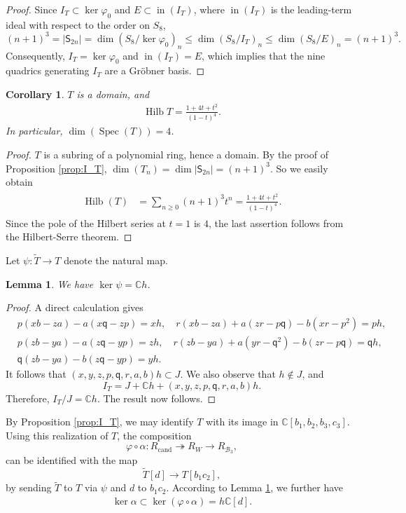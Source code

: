 \documentclass[11pt]{amsart}
\newtheorem{lemma}[theorem]{Lemma}
\newtheorem{corollary}[theorem]{Corollary}
\theoremstyle{definition}
\theoremstyle{remark}
\newcommand{\B}{\mathcal B}
\begin{document}
\begin{proof}
Since $I_T\subset \ker \varphi_0$ and $E\subset \operatorname{in}(I_T)$, where $ \operatorname{in}(I_T)$ is the leading-term ideal with respect to the order on $S_8$, 
\[(n+1)^3=|\mathsf{S}_{2n}|=\dim(S_8/\ker \varphi_0)_{n}\leq \dim(S_8/I_T)_n\leq \dim(S_8/E)_n=(n+1)^3.\] Consequently, $I_T=\ker \varphi_0$ and $\operatorname{in}(I_T)=E$, which implies that the nine quadrics generating $I_T$ are a Gr\"{o}bner basis.  \end{proof}
\begin{corollary}\label{cor:HilbT}
$T$ is a domain, and 
\begin{align*}
\operatorname{Hilb}T=\frac{1+4t+t^2}{(1-t)^4}.	
\end{align*}
In particular, $\dim (\operatorname{Spec}(T))=4$. 
\end{corollary}
\begin{proof}
$T$ is a subring of a polynomial ring, hence a domain. By the proof of Proposition \ref{prop:I_T}, $\dim(T_n)=\dim |\mathsf S_{2n}|=(n+1)^3$. So we easily obtain
\begin{align}\label{formu:HilbT}
\begin{split}
\operatorname{Hilb}(T)&=\sum_{n\geq 0} (n+1)^3 t^n=\frac{1+4t+t^2}{(1-t)^4}.
\end{split}
\end{align}
Since the pole of the Hilbert series at $t=1$ is $4$, the last assertion follows from the Hilbert-Serre theorem.
\end{proof}



Let $\psi: \tilde{T}\rightarrow T$ denote the natural map. 
\begin{lemma}\label{lem:kerpsi}
We have $\ker \psi=\mathbb{C}h$.
\end{lemma}
\begin{proof}
A direct calculation gives
\begin{align*}
	&p(xb-za)-a(x\mathsf q-z p)=xh,\quad r(xb-za)+a(zr-p\mathsf q)-b(xr-p^2)=ph,\\
	&p(zb-ya)-a(z\mathsf q-yp)=zh,\quad r(zb-ya)+a(yr-\mathsf{q}^2)-b(zr-p\mathsf{q})=\mathsf{q}h,\\
	&\mathsf{q}(zb-ya)-b(z\mathsf{q}-yp)=yh.
\end{align*}
It follows that $(x,y,z,p,\mathsf{q},r,a,b)h\subset J$. We also observe that $h\notin J$, and \[I_T=J+\mathbb{C}h+(x,y,z,p,\mathsf{q},r,a,b)h.\] Therefore, $I_T/J=\mathbb{C}h$. The result now follows. 
\end{proof}
By Proposition \ref{prop:I_T},  we may identify $T$ with its image in $\mathbb{C}[b_1,b_2,b_3,c_3]$. Using this realization of $T$, the composition 
\[\varphi\circ \alpha: R_{\mathrm{cand}}\twoheadrightarrow R_W \rightarrow R_{\B_3},\] can be identified with the map \[\tilde{T}[d]\longrightarrow T[b_1c_2],\] by sending $\tilde{T}$ to $T$ via $\psi$ and $d$ to $b_1c_2$.  According to Lemma \ref{lem:kerpsi}, we further have
\begin{align}\label{formula:ker(al)} \ker\alpha \subset \ker(\varphi\circ \alpha)=h\mathbb{C}[d].
\end{align}
\end{document}
